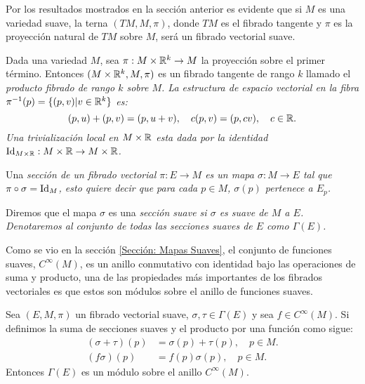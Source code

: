 \begin{example}
	Por los resultados mostrados en la sección anterior es evidente que si $M$ es una variedad suave, la terna $(TM, M, \pi)$, donde $TM$ es el fibrado tangente y $\pi$ es la proyección natural de $TM$ sobre $M$, será un fibrado vectorial suave.
\end{example}

\begin{example}
	Dada una variedad $M$, sea $\pi: M \times \mathbb{R}^{k} \to M$ la proyección sobre el primer término. Entonces $(M \times \mathbb{R}^{k}, M, \pi)$ es un fibrado tangente de rango $k$ llamado el \it{producto fibrado} de rango $k$ sobre $M$. La estructura de espacio vectorial en la fibra $\pi^{-1}(p) = \{(p,v) | v \in \mathbb{R}^{k}\}$ es:
	\[
		(p,u) + (p,v) = (p, u+v), \quad c(p,v) = (p,cv), \quad c \in \mathbb{R}.
	\]
	Una trivialización local en $M \times \mathbb{R}$ esta dada por la identidad $\mathrm{Id}_{M \times \mathbb{R}}: M \times \mathbb{R} \to  M \times \mathbb{R}$.
\end{example}

\begin{definition}
	Una \it{sección} de un fibrado vectorial $\pi: E \to M$ es un mapa $\sigma: M \to E$ tal que $\pi \circ \sigma = \mathrm{Id}_{M}$, esto quiere decir que para cada $p \in M$, $\sigma(p)$ pertenece a $E_p$.

	Diremos que el mapa $\sigma$ es una \it{sección suave} si $\sigma$ es suave de $M$ a $E$. Denotaremos al conjunto de todas las secciones suaves de $E$ como $\Gamma(E)$.
\end{definition}

Como se vio en la sección \ref{Sección: Mapas Suaves}, el conjunto de funciones suaves, $C^{\infty}(M)$, es un anillo conmutativo con identidad bajo las operaciones de suma y producto, una de las propiedades más importantes de los fibrados vectoriales es que estos son módulos sobre el anillo de funciones suaves.

\begin{theorem}\label{Teorema: Los Fibrados Vectoriales Son Modulos}
	Sea $(E,M, \pi)$ un fibrado vectorial suave, $\sigma, \tau \in \Gamma(E)$ y sea $f \in C^{\infty}(M)$. Si definimos la suma de secciones suaves y el producto por una función como sigue:
	\begin{align*}
		(\sigma + \tau)(p) & = \sigma(p) + \tau(p), \quad p \in M. \\
		(f\sigma)(p)       & = f(p)\sigma(p), \quad p \in M.
	\end{align*}
	Entonces $\Gamma(E)$ es un módulo sobre el anillo $C^{\infty}(M)$.
\end{theorem}

